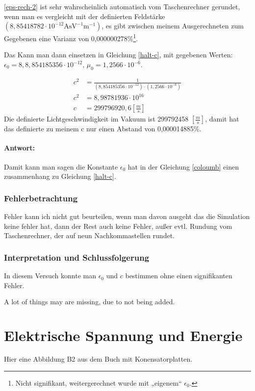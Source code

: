\documentclass[a4paper]{report}
\begin{document}
\ref{eps-rech-2} ist sehr wahrscheinlich automatisch vom Taschenrechner gerundet,
wenn man es vergleicht mit der definierten Feldstärke $(8,85418782\cdot
10^{-12}\text{AsV}^{-1}\text{m}^{-1})$, es gibt zwischen meinem
Ausgerechneten zum Gegebenen eine Varianz von 0,000000278\%\footnote{Nicht
signifikant, weitergerechnet wurde mit  „eigenem“ $\epsilon_0$.}.

Das Kann man dann einsetzen in Gleichung \ref{halt-c}, mit gegebenen Werten:
$\epsilon_0 = 8,8,854185356 \cdot 10^{-12}$, $\mu_0=1,2566\cdot 10^{-6}$.

\begin{align}
  c^2 &= \frac{1}{(8,854185356 \cdot 10^{-12})\cdot (1,2566\cdot 10^{-6})}\\
  c^2 &= 8,98781936\cdot 10^{16}\\
  c   &= 299796920,6 \left[\frac{m}{s}\right]
\end{align}
Die definierte Lichtgeschwindigkeit im Vakuum ist 299792458
$\left[\frac{m}{s}\right]$, damit hat das definierte zu meinem c nur einen
Abstand von 0,000014885\%.

\paragraph{Antwort:}
Damit kann man sagen die Konstante $\epsilon_0$ hat in der Gleichung
\ref{coloumb} einen zusammenhang zu Gleichung \ref{halt-c}.


\subsubsection{Fehlerbetrachtung} %
\label{ssub:Fehlerbetrachtung}
Fehler kann ich nicht gut beurteilen, wenn man davon ausgeht das die Simulation
keine fehler hat, dann der Rest auch keine Fehler, außer evtl. Rundung vom
Taschenrechner, der auf neun Nachkommastellen rundet.


\subsubsection{Interpretation und Schlussfolgerung} %
\label{ssub:Interpretation und Schlussfolgerung}
In diesem Versuch konnte man $\epsilon_0$ und $c$ bestimmen ohne einen signifikanten Fehler.


A lot of things may are missing, due to not being added.
\section{Elektrische Spannung und Energie}
Hier eine Abbildung B2 aus dem Buch mit Konensatorplatten.
\end{document}
